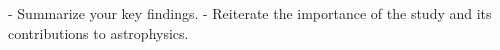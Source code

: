 - Summarize your key findings.  
   - Reiterate the importance of the study and its contributions to astrophysics. 